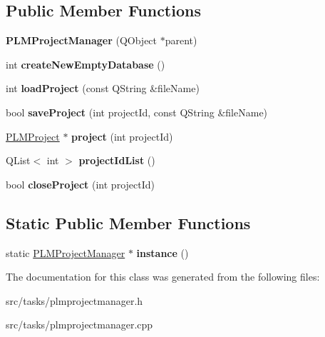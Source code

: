 \subsection*{Public Member Functions}
\begin{DoxyCompactItemize}
\item 
{\bfseries P\+L\+M\+Project\+Manager} (Q\+Object $\ast$parent)\hypertarget{class_p_l_m_project_manager_a6a2fbe712e30e3824c09de4dad21046c}{}\label{class_p_l_m_project_manager_a6a2fbe712e30e3824c09de4dad21046c}

\item 
int {\bfseries create\+New\+Empty\+Database} ()\hypertarget{class_p_l_m_project_manager_adbd9c5f0c8e884b7c42931f78940aed8}{}\label{class_p_l_m_project_manager_adbd9c5f0c8e884b7c42931f78940aed8}

\item 
int {\bfseries load\+Project} (const Q\+String \&file\+Name)\hypertarget{class_p_l_m_project_manager_a806ac2c6f430e80b3dc7c09e08eb1cf2}{}\label{class_p_l_m_project_manager_a806ac2c6f430e80b3dc7c09e08eb1cf2}

\item 
bool {\bfseries save\+Project} (int project\+Id, const Q\+String \&file\+Name)\hypertarget{class_p_l_m_project_manager_ac9d3c33f2d0af139948b88899388e029}{}\label{class_p_l_m_project_manager_ac9d3c33f2d0af139948b88899388e029}

\item 
\hyperlink{class_p_l_m_project}{P\+L\+M\+Project} $\ast$ {\bfseries project} (int project\+Id)\hypertarget{class_p_l_m_project_manager_a74d05776c72ca6964552811dcabecd02}{}\label{class_p_l_m_project_manager_a74d05776c72ca6964552811dcabecd02}

\item 
Q\+List$<$ int $>$ {\bfseries project\+Id\+List} ()\hypertarget{class_p_l_m_project_manager_a9d06c5f9870e9e866af5d5e8c91a4172}{}\label{class_p_l_m_project_manager_a9d06c5f9870e9e866af5d5e8c91a4172}

\item 
bool {\bfseries close\+Project} (int project\+Id)\hypertarget{class_p_l_m_project_manager_aec3e4e13f3effef81f52b9b2ffc91186}{}\label{class_p_l_m_project_manager_aec3e4e13f3effef81f52b9b2ffc91186}

\end{DoxyCompactItemize}
\subsection*{Static Public Member Functions}
\begin{DoxyCompactItemize}
\item 
static \hyperlink{class_p_l_m_project_manager}{P\+L\+M\+Project\+Manager} $\ast$ {\bfseries instance} ()\hypertarget{class_p_l_m_project_manager_abdea0c6b66f64d77e961d6cfbbb70a5a}{}\label{class_p_l_m_project_manager_abdea0c6b66f64d77e961d6cfbbb70a5a}

\end{DoxyCompactItemize}


The documentation for this class was generated from the following files\+:\begin{DoxyCompactItemize}
\item 
src/tasks/plmprojectmanager.\+h\item 
src/tasks/plmprojectmanager.\+cpp\end{DoxyCompactItemize}
